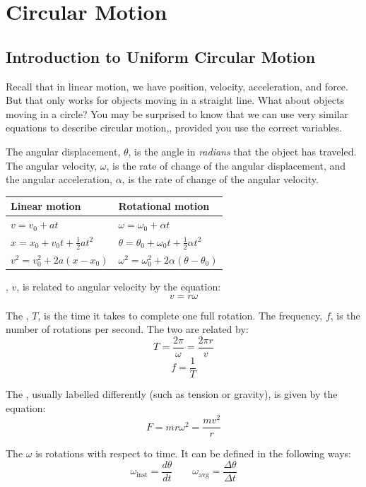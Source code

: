\chapter{Circular Motion}
\section{Introduction to Uniform Circular Motion}
Recall that in linear motion, we have position, velocity, acceleration, and force. But that only works for objects moving in a straight line. What about objects moving in a circle? You may be surprised to know that we can use very similar equations to describe circular motion,, provided you use the correct variables. 

The angular displacement, $\theta$, is the angle in \emph{radians} that the object has traveled. The angular velocity, $\omega$, is the rate of change of the angular displacement, and the angular acceleration, $\alpha$, is the rate of change of the angular velocity.

\begin{center}
\begin{tabular}{l l}
Linear motion & Rotational motion \\ \hline
$v = v_0 + a t$ & $\omega = \omega_0 + \alpha t$ \\[4pt]
$x = x_0 + v_0 t + \tfrac{1}{2} a t^2$ & $\theta = \theta_0 + \omega_0 t + \tfrac{1}{2} \alpha t^2$ \\[4pt]
$v^2 = v_0^2 + 2a(x - x_0)$ & $\omega^2 = \omega_0^2 + 2\alpha(\theta - \theta_0)$
\end{tabular}
\end{center}

, $v$, is related to angular velocity by the equation:
$$v = r \omega$$    

The , $T$, is the time it takes to complete one full rotation. The frequency, $f$, is the number of rotations per second. The two are related by:
$$T = \frac{2\pi}{\omega} = \frac{2\pi r}{v}$$
$$f = \frac{1}{T}$$

The , usually labelled differently (such as tension or gravity), is given by the equation:
$$F = m r \omega^2 = \frac{m v^2}{r}$$


The  $\omega$ is rotations with respect to time. It can be defined in the following ways:
\[
  {\omega_{\text{inst}} = \frac{d\theta}{dt}}
  \qquad
  {\omega_{\text{avg}} = \frac{\Delta\theta}{\Delta t}}
\]

